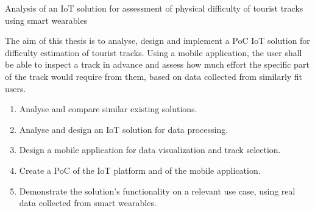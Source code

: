 \linebreak
Analysis of an IoT solution for assessment of physical difficulty of tourist tracks using smart wearables

The aim of this thesis is to analyse, design and implement a PoC IoT solution for difficulty estimation of tourist tracks.
Using a mobile application, the user shall be able to inspect a track in advance and assess how much effort the specific part of the track would require from them, based on data collected from similarly fit users.
\begin{enumerate}
    \item Analyse and compare similar existing solutions.
    \item Analyse and design an IoT solution for data processing.
    \item Design a mobile application for data visualization and track selection.
    \item Create a PoC of the IoT platform and of the mobile application.
    \item Demonstrate the solution's functionality on a relevant use case, using real data collected from smart wearables.
\end{enumerate}
